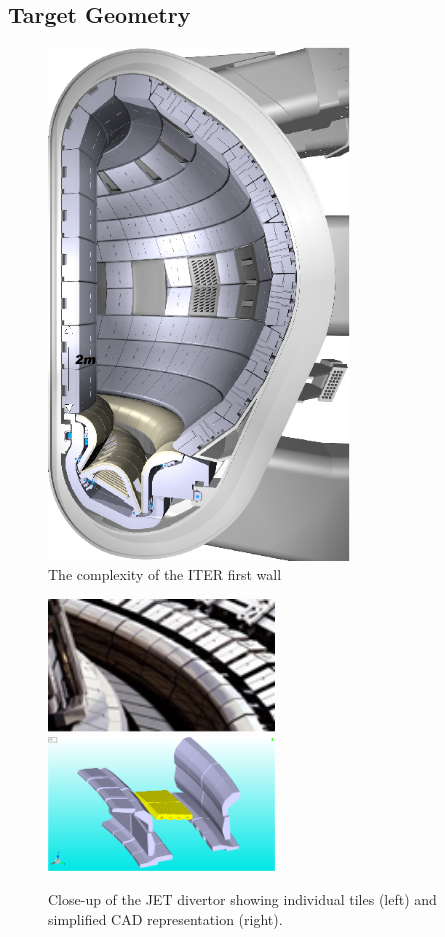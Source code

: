 \subsection{Target Geometry}\label{sec:targetgeom}
\begin{figure}
\centerline{\includegraphics[width=8cm]{../png/iterfw}}
\caption{The complexity of the ITER first wall\label{fig:iterfw}}
\end{figure}
\begin{figure}
\centerline{\includegraphics[width=6cm]{../png/jetdiveclose}
\includegraphics[width=6cm]{../png/pretty}}
\caption{Close-up of the JET divertor showing individual tiles (left) and
simplified CAD representation (right).\label{fig:jetdive}}
\end{figure}
